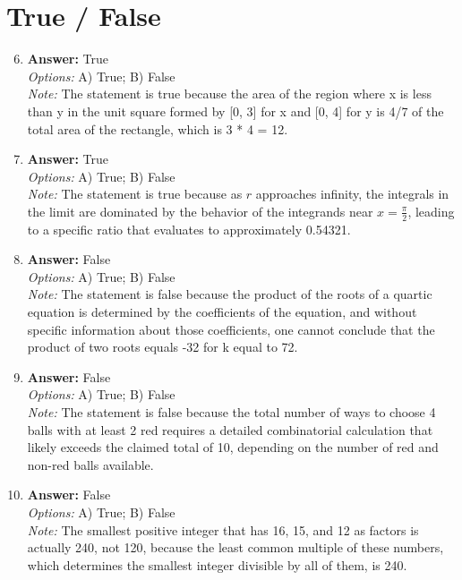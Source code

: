 \documentclass[12pt]{article}
\begin{document}
\section*{True / False}
\begin{enumerate}[label=\arabic*.]
\setcounter{enumi}{5}
\item \textbf{Answer:} True
\\ \textit{Options:} A) True; B) False
\\ \textit{Note:} The statement is true because the area of the region where x is less than y in the unit square formed by [0, 3] for x and [0, 4] for y is 4/7 of the total area of the rectangle, which is 3 * 4 = 12.
\item \textbf{Answer:} True
\\ \textit{Options:} A) True; B) False
\\ \textit{Note:} The statement is true because as \( r \) approaches infinity, the integrals in the limit are dominated by the behavior of the integrands near \( x = \frac{\pi}{2} \), leading to a specific ratio that evaluates to approximately 0.54321.
\item \textbf{Answer:} False
\\ \textit{Options:} A) True; B) False
\\ \textit{Note:} The statement is false because the product of the roots of a quartic equation is determined by the coefficients of the equation, and without specific information about those coefficients, one cannot conclude that the product of two roots equals -32 for k equal to 72.
\item \textbf{Answer:} False
\\ \textit{Options:} A) True; B) False
\\ \textit{Note:} The statement is false because the total number of ways to choose 4 balls with at least 2 red requires a detailed combinatorial calculation that likely exceeds the claimed total of 10, depending on the number of red and non-red balls available.
\item \textbf{Answer:} False
\\ \textit{Options:} A) True; B) False
\\ \textit{Note:} The smallest positive integer that has 16, 15, and 12 as factors is actually 240, not 120, because the least common multiple of these numbers, which determines the smallest integer divisible by all of them, is 240.
\end{enumerate}
\end{document}
